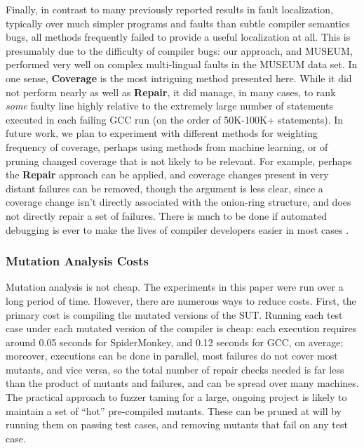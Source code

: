 Finally, in contrast to many previously reported results in fault localization, typically over much simpler programs and faults than subtle compiler semantics bugs, all methods frequently failed to provide a useful localization at all.  This is presumably due to the difficulty of compiler bugs:  our approach, and MUSEUM, performed very well on complex multi-lingual faults in the MUSEUM data set.  In one sense, {\bf Coverage} is the most intriguing method presented here.  While it did not perform nearly as well as {\bf Repair}, it did manage, in many cases, to rank \emph{some} faulty line highly relative to the extremely large number of statements executed in each failing GCC run (on the order of 50K-100K+ statements).  In future work, we plan to experiment with different methods for weighting frequency of coverage, perhaps using methods from machine learning, or of pruning changed coverage that is not likely to be relevant.  For example, perhaps the {\bf Repair} approach can be applied, and coverage changes present in very distant failures can be removed, though the argument is less clear, since a coverage change isn't directly associated with the onion-ring structure, and does not directly repair a set of failures.  There is much to be done if automated debugging is ever to make the lives of compiler developers easier in most cases \cite{AutoHelp}.  


\subsubsection{Mutation Analysis Costs}

Mutation analysis is not cheap.  The experiments in this paper were run over a long period of time.  However, there are numerous ways to reduce costs.  First, the primary cost is compiling the mutated versions of the SUT.  Running each test case under each mutated version of the compiler is cheap: each execution requires around 0.05 seconds for SpiderMonkey, and 0.12 seconds for GCC, on average; moreover, executions can be done in parallel, most failures do not cover most mutants, and vice versa, so the total number of repair checks needed is far less than the product of mutants and failures, and can be spread over many machines.  The practical approach to fuzzer taming for a large, ongoing project is likely to maintain a set of ``hot'' pre-compiled mutants.  These can be pruned at will by running them on passing test cases, and removing mutants that fail on any test case.  

